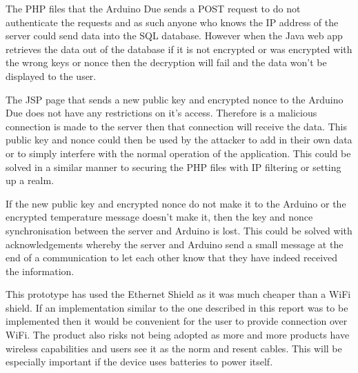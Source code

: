 The PHP files that the Arduino Due sends a POST request to do not authenticate the requests and as such anyone who knows the IP address of the server could send data into the SQL database. However when the Java web app retrieves the data out of the database if it is not encrypted or was encrypted with the wrong keys or nonce then the decryption will fail and the data won't be displayed to the user.

The JSP page that sends a new public key and encrypted nonce to the Arduino Due does not have any restrictions on it's access. Therefore is a malicious connection is made to the server then that connection will receive the data. This public key and nonce could then be used by the attacker to add in their own data or to simply interfere with the normal operation of the application. This could be solved in a similar manner to securing the PHP files with IP filtering or setting up a realm.

If the new public key and encrypted nonce do not make it to the Arduino or the encrypted temperature message doesn't make it, then the key and nonce synchronisation between the server and Arduino is lost. This could be solved with acknowledgements whereby the server and Arduino send a small message at the end of a communication to let each other know that they have indeed received the information.

This prototype has used the Ethernet Shield as it was much cheaper than a WiFi shield. If an implementation similar to the one described in this report was to be implemented then it would be convenient for the user to provide connection over WiFi. The product also risks not being adopted as more and more products have wireless capabilities and users see it as the norm and resent cables. This will be especially important if the device uses batteries to power itself.
